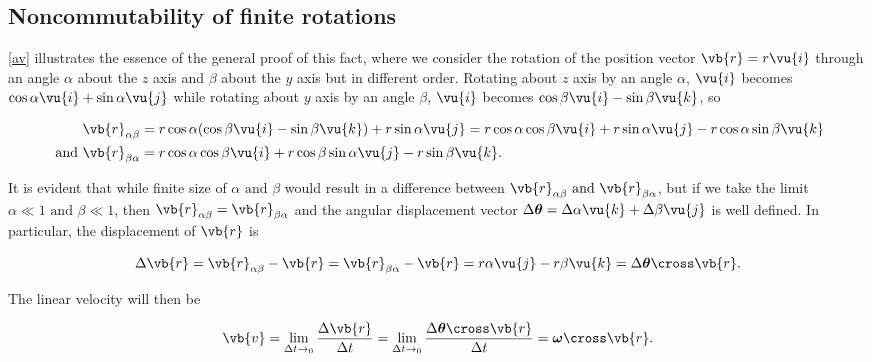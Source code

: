 \documentclass[a4paper,12pt]{report}
\begin{document}
\begin{appendices}
\section{Noncommutability of finite rotations} \label{ap2}
\cref{av}  illustrates the essence of the general proof of this fact, where we consider the rotation of the position vector \(\vb{r} = r \vu{i}  \) through an angle \(\alpha \) about the \(z\) axis and \(\beta \) about the \(y\) axis but in different order. Rotating about \(z\) axis by an angle \(\alpha \), \(\vu{i} \) becomes \(\cos \alpha \vu{i} + \sin \alpha \vu{j} \) while rotating about \(y\) axis by an angle \(\beta \), \(\vu{i} \) becomes \(\cos \beta \vu{i} - \sin \beta \vu{k} \), so

\begin{equation}
\begin{aligned}
	\vb{r} _{\alpha \beta } &= r\cos \alpha (\cos \beta \vu{i} - \sin \beta \vu{k} ) + r\sin \alpha \vu{j} = r\cos \alpha \cos \beta \vu{i} + r\sin \alpha \vu{j} - r\cos \alpha \sin \beta \vu{k} \\
	\text{ and } \vb{r} _{\beta \alpha } &= r\cos \alpha \cos \beta \vu{i} + r\cos \beta \sin \alpha \vu{j} - r\sin \beta \vu{k} .
\end{aligned}
\end{equation}

It is evident that while finite size of \(\alpha  \text{ and } \beta \) would result in a difference between  \(\vb{r} _{\alpha \beta  } \text{ and } \vb{r} _{\beta \alpha } \), but if we take the limit \(\alpha \ll 1 \text{ and } \beta \ll 1 \), then \(\vb{r} _{\alpha \beta } = \vb{r} _{\beta \alpha } \) and the angular displacement vector \(\Delta \boldsymbol{\theta }  = \Delta \alpha \vu{k} +\Delta  \beta  \vu{j} \) is well defined. In particular, the displacement of \(\vb{r} \) is 

\begin{equation}
	\Delta \vb{r} = \vb{r} _{\alpha  \beta } - \vb{r}  = \vb{r} _{\beta \alpha } - \vb{r}   = r\alpha \vu{j} - r\beta \vu{k}  = \Delta \boldsymbol{\theta } \cross \vb{r} .
\end{equation}

The linear velocity will then be

\begin{equation}
	\vb{v} = \lim_{\Delta  t\to_0} \frac{\Delta \vb{r} }{\Delta t} = \lim_{\Delta t\to_0} \frac{\Delta \boldsymbol{\theta } \cross \vb{r} }{\Delta t} = \boldsymbol{\omega } \cross \vb{r} .    
\end{equation}


\end{appendices}
\end{document}
